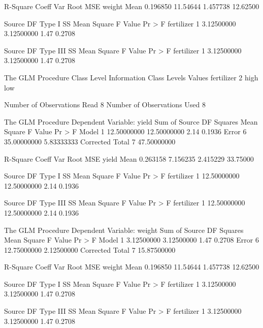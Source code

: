 \documentclass{article}
\begin{document}
\begin{Woutput}
R-Square     Coeff Var      Root MSE    weight Mean
0.196850      11.54644      1.457738       12.62500

Source                      DF       Type I SS     Mean Square    F Value    Pr > F
fertilizer                   1      3.12500000      3.12500000       1.47    0.2708

Source                      DF     Type III SS     Mean Square    F Value    Pr > F
fertilizer                   1      3.12500000      3.12500000       1.47    0.2708

The GLM Procedure
      Class Level Information
Class           Levels    Values
fertilizer           2    high low

Number of Observations Read           8
Number of Observations Used           8

The GLM Procedure
Dependent Variable: yield
                                        Sum of
Source                      DF         Squares     Mean Square    F Value    Pr > F
Model                        1     12.50000000     12.50000000       2.14    0.1936
Error                        6     35.00000000      5.83333333
Corrected Total              7     47.50000000

R-Square     Coeff Var      Root MSE    yield Mean
0.263158      7.156235      2.415229      33.75000

Source                      DF       Type I SS     Mean Square    F Value    Pr > F
fertilizer                   1     12.50000000     12.50000000       2.14    0.1936

Source                      DF     Type III SS     Mean Square    F Value    Pr > F
fertilizer                   1     12.50000000     12.50000000       2.14    0.1936

The GLM Procedure
Dependent Variable: weight
                                        Sum of
Source                      DF         Squares     Mean Square    F Value    Pr > F
Model                        1      3.12500000      3.12500000       1.47    0.2708
Error                        6     12.75000000      2.12500000
Corrected Total              7     15.87500000

R-Square     Coeff Var      Root MSE    weight Mean
0.196850      11.54644      1.457738       12.62500

Source                      DF       Type I SS     Mean Square    F Value    Pr > F
fertilizer                   1      3.12500000      3.12500000       1.47    0.2708

Source                      DF     Type III SS     Mean Square    F Value    Pr > F
fertilizer                   1      3.12500000      3.12500000       1.47    0.2708


\end{Woutput}
\end{document}
